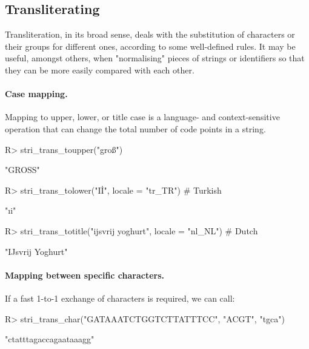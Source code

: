 \documentclass[nojss]{jss}\usepackage[]{graphicx}\usepackage[]{color}
\begin{document}
\subsection{Transliterating}

Transliteration, in its broad sense, deals with the substitution
of characters or their groups for different ones, according to some
well-defined rules. It may be useful, amongst others, when "normalising"
pieces of strings or identifiers so that they can be more easily
compared with each other.


\paragraph{Case mapping.}
Mapping to  upper, lower, or title case
is a language- and context-sensitive operation
that can change the total number of code points in a string.



\begin{Schunk}
\begin{Sinput}
R> stri_trans_toupper("groß")
\end{Sinput}
\begin{Soutput}
[1] "GROSS"
\end{Soutput}
\begin{Sinput}
R> stri_trans_tolower("Iİ", locale = "tr_TR")               # Turkish
\end{Sinput}
\begin{Soutput}
[1] "ıi"
\end{Soutput}
\begin{Sinput}
R> stri_trans_totitle("ijsvrij yoghurt", locale = "nl_NL")  # Dutch
\end{Sinput}
\begin{Soutput}
[1] "IJsvrij Yoghurt"
\end{Soutput}
\end{Schunk}





\paragraph{Mapping between specific characters.}
If a fast 1-to-1 exchange of characters is required, we can call:

\begin{Schunk}
\begin{Sinput}
R> stri_trans_char("GATAAATCTGGTCTTATTTCC", "ACGT", "tgca")
\end{Sinput}
\begin{Soutput}
[1] "ctatttagaccagaataaagg"
\end{Soutput}
\end{Schunk}
\end{document}
